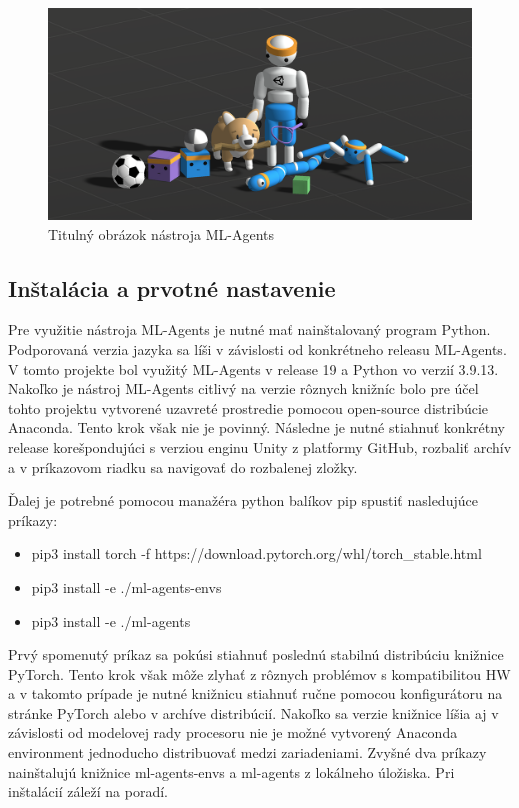 \documentclass[slovak, master]{diploma}
\begin{document}
\begin{figure}[!htbp]
    \centering
    \includegraphics[width=1\textwidth]{Figures/mlagents.png}
    \caption{Titulný obrázok nástroja ML-Agents \cite{mlagentsWeb}}
    \label{pic:mlagetnsLogo}
\end{figure}

\subsection{Inštalácia a prvotné nastavenie}
\label{sec:MLAgentsInstall}
Pre využitie nástroja ML-Agents je nutné mať nainštalovaný program Python. Podporovaná verzia jazyka sa líši v závislosti od konkrétneho releasu ML-Agents. V tomto projekte bol využitý ML-Agents v release 19 a Python vo verzií 3.9.13. Nakoľko je nástroj ML-Agents citlivý na verzie rôznych knižníc bolo pre účel tohto projektu vytvorené uzavreté prostredie pomocou open-source distribúcie Anaconda. Tento krok však nie je povinný. Následne je nutné stiahnuť konkrétny release korešpondujúci s verziou enginu Unity z platformy GitHub, rozbaliť archív a v príkazovom riadku sa navigovať do rozbalenej zložky.

Ďalej je potrebné pomocou manažéra python balíkov pip spustiť nasledujúce príkazy:
\begin{itemize}
  \item pip3 install torch -f https://download.pytorch.org/whl/torch\_stable.html
  \item pip3 install -e ./ml-agents-envs
  \item pip3 install -e ./ml-agents
\end{itemize}

Prvý spomenutý príkaz sa pokúsi stiahnuť poslednú stabilnú distribúciu knižnice PyTorch. Tento krok však môže zlyhať z rôznych problémov s kompatibilitou HW a v takomto prípade je nutné knižnicu stiahnuť ručne pomocou konfigurátoru na stránke PyTorch alebo v archíve distribúcií. Nakoľko sa verzie knižnice líšia aj v závislosti od modelovej rady procesoru nie je možné vytvorený Anaconda environment jednoducho distribuovať medzi zariadeniami. Zvyšné dva príkazy nainštalujú knižnice ml-agents-envs a ml-agents z lokálneho úložiska. Pri inštalácií záleží na poradí.
\end{document}
